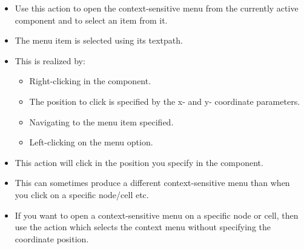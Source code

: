 
\begin{itemize}
\item Use this action to open the context-sensitive menu from the currently active component and to select an item from it.
\item The menu item is selected using its textpath. 
\item This is realized by:
\begin{itemize}
\item Right-clicking in the component.
\item The position to click is specified by the x- and y- coordinate parameters.
\item Navigating to the menu item specified.
\item Left-clicking on the menu option.  
\end{itemize}
\item This action will click in the position you specify in the component.
\item This can sometimes produce a different context-sensitive menu than when you click on a specific node/cell etc.
\item If you want to open a context-sensitive menu on a specific node or cell, then use the action which selects the context menu without specifying the coordinate position.
\end{itemize}

